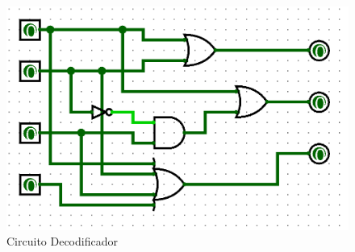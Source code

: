 \begin{figure}
    \centering
    \includegraphics[height = 0.33\textheight]{recursos/Ejercicio4/CircuitoDecodificador.png}\par
    \caption*{Circuito Decodificador}
\end{figure} 

